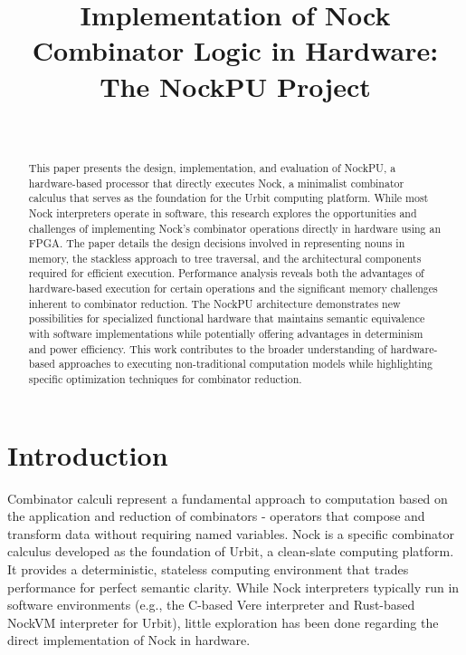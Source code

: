 \documentclass[twoside]{article}
\title{Implementation of Nock Combinator Logic in Hardware: The NockPU Project}
\author{\authorname~\authorpatp \\ \affiliation}
\date{}
\begin{document}
\maketitle
\thispagestyle{firststyle}

\begin{abstract}
This paper presents the design, implementation, and evaluation of NockPU, a hardware-based processor that directly executes Nock, a minimalist combinator calculus that serves as the foundation for the Urbit computing platform. While most Nock interpreters operate in software, this research explores the opportunities and challenges of implementing Nock's combinator operations directly in hardware using an FPGA. The paper details the design decisions involved in representing nouns in memory, the stackless approach to tree traversal, and the architectural components required for efficient execution. Performance analysis reveals both the advantages of hardware-based execution for certain operations and the significant memory challenges inherent to combinator reduction. The NockPU architecture demonstrates new possibilities for specialized functional hardware that maintains semantic equivalence with software implementations while potentially offering advantages in determinism and power efficiency. This work contributes to the broader understanding of hardware-based approaches to executing non-traditional computation models while highlighting specific optimization techniques for combinator reduction.
\end{abstract}

\setcounter{page}{1}

\tableofcontents

\section{Introduction}

Combinator calculi represent a fundamental approach to computation based on the application and reduction of combinators - operators that compose and transform data without requiring named variables. Nock is a specific combinator calculus developed as the foundation of Urbit, a clean-slate computing platform. It provides a deterministic, stateless computing environment that trades performance for perfect semantic clarity. While Nock interpreters typically run in software environments (e.g., the C-based Vere interpreter and Rust-based NockVM interpreter for Urbit), little exploration has been done regarding the direct implementation of Nock in hardware.
\end{document}
